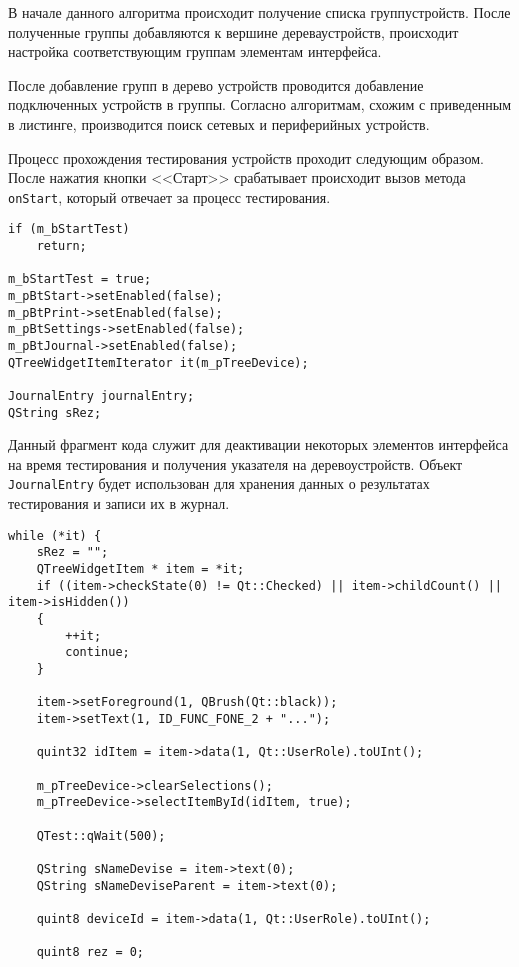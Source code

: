 В начале данного алгоритма происходит получение списка групп\break устройств. После полученные группы добавляются к вершине
дерева\break устройств, происходит настройка соответствующим группам элементам интерфейса.

После добавление групп в дерево устройств проводится добавление подключенных устройств в группы.
Согласно алгоритмам, схожим с приведенным в листинге, производится поиск сетевых и
периферийных устройств.

Процесс прохождения тестирования устройств проходит следующим образом. После нажатия кнопки <<Старт>> срабатывает
происходит вызов метода \texttt{onStart}, который отвечает за процесс тестирования.
\medskip
\begin{verbatim}
if (m_bStartTest)
	return;

m_bStartTest = true;
m_pBtStart->setEnabled(false);
m_pBtPrint->setEnabled(false);
m_pBtSettings->setEnabled(false);
m_pBtJournal->setEnabled(false);
QTreeWidgetItemIterator it(m_pTreeDevice);

JournalEntry journalEntry;
QString sRez;
\end{verbatim}
\medskip

Данный фрагмент кода служит для деактивации некоторых элементов интерфейса на время тестирования и получения указателя
на дерево\break устройств. Объект \texttt{JournalEntry} будет использован для хранения данных о результатах тестирования и
записи их в журнал.
\medskip
\begin{verbatim}
while (*it) {
	sRez = "";
	QTreeWidgetItem * item = *it;
	if ((item->checkState(0) != Qt::Checked) || item->childCount() || item->isHidden())
	{
		++it;
		continue;
	}

	item->setForeground(1, QBrush(Qt::black));
	item->setText(1, ID_FUNC_FONE_2 + "...");

	quint32 idItem = item->data(1, Qt::UserRole).toUInt();

	m_pTreeDevice->clearSelections();
	m_pTreeDevice->selectItemById(idItem, true);

	QTest::qWait(500);

	QString sNameDevise = item->text(0);
	QString sNameDeviseParent = item->text(0);

	quint8 deviceId = item->data(1, Qt::UserRole).toUInt();

	quint8 rez = 0;
\end{verbatim}
\medskip

